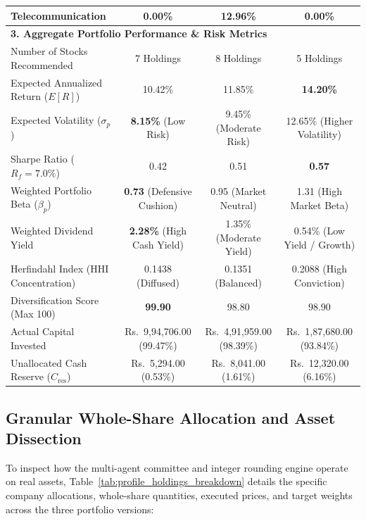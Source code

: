 \begin{table}[H]
{\begin{tabular}{lccc}
Telecommunication & 0.00\% & 12.96\% & 0.00\% \\
\midrule
\multicolumn{4}{l}{\textbf{3. Aggregate Portfolio Performance \& Risk Metrics}} \\
Number of Stocks Recommended & 7 Holdings & 8 Holdings & 5 Holdings \\
Expected Annualized Return ($E[R]$) & 10.42\% & 11.85\% & \textbf{14.20\%} \\
Expected Volatility ($\sigma_p$) & \textbf{8.15\%} (Low Risk) & 9.45\% (Moderate Risk) & 12.65\% (Higher Volatility) \\
Sharpe Ratio ($R_f = 7.0\%$) & 0.42 & 0.51 & \textbf{0.57} \\
Weighted Portfolio Beta ($\beta_p$) & \textbf{0.73} (Defensive Cushion) & 0.95 (Market Neutral) & 1.31 (High Market Beta) \\
Weighted Dividend Yield & \textbf{2.28\%} (High Cash Yield) & 1.35\% (Moderate Yield) & 0.54\% (Low Yield / Growth) \\
Herfindahl Index (HHI Concentration) & 0.1438 (Diffused) & 0.1351 (Balanced) & 0.2088 (High Conviction) \\
Diversification Score (Max 100) & \textbf{99.90} & 98.80 & 98.90 \\
Actual Capital Invested & Rs.~9,94,706.00 (99.47\%) & Rs.~4,91,959.00 (98.39\%) & Rs.~1,87,680.00 (93.84\%) \\
Unallocated Cash Reserve ($C_{\text{res}}$) & Rs.~5,294.00 (0.53\%) & Rs.~8,041.00 (1.61\%) & Rs.~12,320.00 (6.16\%) \\
\bottomrule
\end{tabular}%
}
\end{table}

\subsection{Granular Whole-Share Allocation and Asset Dissection}
To inspect how the multi-agent committee and integer rounding engine operate on real assets, Table~\ref{tab:profile_holdings_breakdown} details the specific company allocations, whole-share quantities, executed prices, and target weights across the three portfolio versions:

